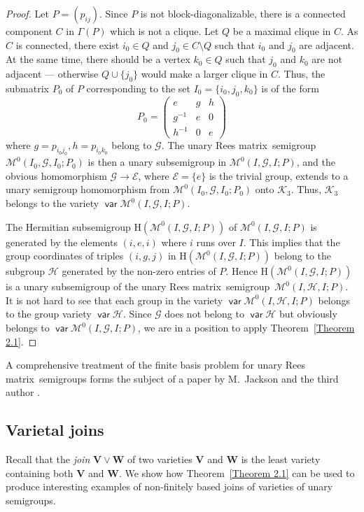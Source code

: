 \documentclass[11pt,reqno]{amsart}
\DeclareMathOperator{\var}{\mathsf{var}}
\numberwithin{equation}{section}
\theoremstyle{remark}
\def\cal{\mathcal}
\def\Mc{{\cal M}}
\def\H{\mathrm H}
\def\Rm{Rees matrix}
\def\sm{semi\-group}
\begin{document}
\begin{proof}
Let $P=(p_{ij})$. Since $P$ is not block-diagonalizable, there is
a connected component $C$ in $\Gamma(P)$ which is not a clique.
Let $Q$ be a maximal clique in $C$. As $C$ is connected, there
exist $i_0\in Q$ and $j_0\in C\setminus Q$ such that $i_0$ and
$j_0$ are adjacent. At the same time, there should be a vertex
$k_0\in Q$ such that $j_0$ and $k_0$ are not adjacent ---
otherwise $Q\cup\{j_0\}$ would make a larger clique in $C$. Thus,
the submatrix $P_0$ of $P$ corresponding to the set
$I_0=\{i_0,j_0,k_0\}$ is of the form
$$P_0=\begin{pmatrix}
e      & g & h\\
g^{-1} & e & 0\\
h^{-1} & 0 & e
\end{pmatrix}$$
where $g=p_{i_0j_0},h=p_{i_0k_0}$ belong to $\mathcal{G}$. The
unary \Rm\ \sm\ $\Mc^0(I_0,\mathcal{G},I_0;P_0)$ is then a unary
subsemigroup in $\Mc^0(I,\mathcal{G},I;P)$, and the obvious
homomorphism $\mathcal{G}\to \mathcal{E}$, where
$\mathcal{E}=\{e\}$ is the trivial group, extends to a unary
semigroup homomorphism from $\Mc^0(I_0,\mathcal{G},I_0;P_0)$ onto
$\mathcal{K}_3$. Thus, $\mathcal{K}_3$ belongs to the variety
$\var\Mc^0(I,\mathcal{G},I;P)$.

The Hermitian subsemigroup $\H(\Mc^0(I,\mathcal{G},I;P))$ of
$\Mc^0(I,\mathcal{G},I;P)$ is generated by the elements $(i,e,i)$
where $i$ runs over $I$. This implies that the group coordinates
of triples $(i,g,j)$ in $\H(\Mc^0(I,\mathcal{G},I;P))$ belong to
the subgroup $\mathcal{H}$ generated by the non-zero entries of
$P$. Hence $\H(\Mc^0(I,\mathcal{G},I;P))$ is a unary subsemigroup
of the unary \Rm\ \sm\ $\Mc^0(I,\mathcal{H},I;P)$. It is not hard
to see that each group in the variety
$\var\Mc^0(I,\mathcal{H},I;P)$ belongs to the group variety $\var
\mathcal{H}$. Since $\mathcal{G}$ does not belong to
$\var\mathcal{H}$ but obviously belongs to
$\var\Mc^0(I,\mathcal{G},I;P)$, we are in a position to apply
Theorem~\ref{Theorem 2.1}.
\end{proof}

A comprehensive treatment of the finite basis problem for unary
\Rm\ semigroups forms the subject of a paper by
M.~Jackson and the third author \cite{jacksonvolkov}.

\subsection{Varietal joins}
Recall that the \emph{join} $\mathbf{V}\vee\mathbf{W}$ of two
varieties $\mathbf{V}$ and $\mathbf{W}$ is the least variety
containing both $\mathbf{V}$ and $\mathbf{W}$. We show how
Theorem~\ref{Theorem 2.1} can be used to produce interesting
examples of non-finitely based joins of varieties of unary
semigroups.
\end{document}
